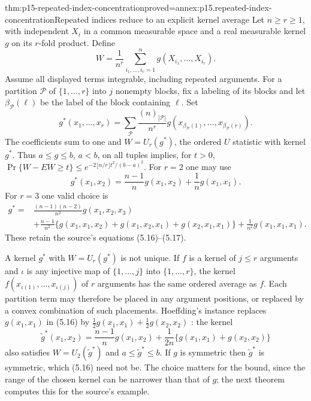 \begin{hbtheorem}{thm:p15-repeated-index-concentration}{proved=annex:p15.repeated-index-concentration}{Repeated indices reduce to an explicit kernel average}
Let \(n\geq r\geq1\), with independent \(X_i\) in a common measurable
space and a real measurable kernel \(g\) on its \(r\)-fold product.
Define
\[
 W=\frac1{n^r}\sum_{i_1,\ldots,i_r=1}^n
                       g(X_{i_1},\ldots,X_{i_r}).
\]
Assume all displayed terms integrable, including repeated arguments.
For a partition \(\mathcal P\) of \(\{1,\ldots,r\}\) into \(j\) nonempty
blocks, fix a labeling of its blocks and let \(\beta_{\mathcal P}(\ell)\)
be the label of the block containing \(\ell\). Set
\[
 g^*(x_1,\ldots,x_r)=
 \sum_{\mathcal P}\frac{(n)_{|\mathcal P|}}{n^r}
 g(x_{\beta_{\mathcal P}(1)},\ldots,x_{\beta_{\mathcal P}(r)}).
\]
The coefficients sum to one and
\(W=U_r(g^*)\), the ordered \(U\) statistic with kernel \(g^*\).
Thus \(a\leq g\leq b\), \(a<b\), on all tuples implies, for \(t>0\),
\(\Pr\{W-EW\geq t\}\leq e^{-2\lfloor n/r\rfloor t^2/(b-a)^2}\).
For \(r=2\) one may use
\[
 g^*(x_1,x_2)=\frac{n-1}{n}g(x_1,x_2)+\frac1n g(x_1,x_1).
\]
For \(r=3\) one valid choice is
\[
\begin{split}
g^*={}&\frac{(n-1)(n-2)}{n^2}g(x_1,x_2,x_3)\\
&+\frac{n-1}{n^2}\{g(x_1,x_1,x_2)+g(x_1,x_2,x_1)+g(x_2,x_1,x_1)\}
+\frac1{n^2}g(x_1,x_1,x_1).
\end{split}
\]
These retain the source's equations (5.16)--(5.17).

A kernel \(g^*\) with \(W=U_r(g^*)\) is not unique. If \(f\) is a kernel
of \(j\leq r\) arguments and \(\iota\) is any injective map of
\(\{1,\ldots,j\}\) into \(\{1,\ldots,r\}\), the kernel
\(f(x_{\iota(1)},\ldots,x_{\iota(j)})\) of \(r\) arguments has the same
ordered average as \(f\). Each partition term may therefore be placed in
any argument positions, or replaced by a convex combination of such
placements. Hoeffding's instance replaces \(g(x_1,x_1)\) in (5.16) by
\(\frac12g(x_1,x_1)+\frac12g(x_2,x_2)\)
\cite[p.~27]{Hoeffding1963BoundedSums}: the kernel
\[
 \tilde g^*(x_1,x_2)=\frac{n-1}{n}g(x_1,x_2)
 +\frac1{2n}\{g(x_1,x_1)+g(x_2,x_2)\}
\]
also satisfies \(W=U_2(\tilde g^*)\) and \(a\leq\tilde g^*\leq b\).
If \(g\) is symmetric then \(\tilde g^*\) is symmetric, which (5.16) need
not be. The choice matters for the bound, since the range of the chosen
kernel can be narrower than that of \(g\); the next theorem computes this
for the source's example.
\end{hbtheorem}

